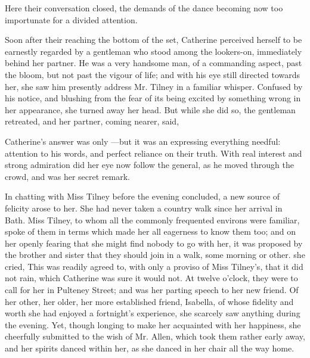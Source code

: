  Here their conversation closed, the demands of the dance becoming now too importunate for a divided attention.

Soon after their reaching the bottom of the set, Catherine perceived herself to be earnestly regarded by a gentleman who stood among the lookers-on, immediately behind her partner. He was a very handsome man, of a commanding aspect, past the bloom, but not past the vigour of life; and with his eye still directed towards her, she saw him presently address Mr. Tilney in a familiar whisper. Confused by his notice, and blushing from the fear of its being excited by something wrong in her appearance, she turned away her head. But while she did so, the gentleman retreated, and her partner, coming nearer, said, 

Catherine's answer was only ---but it was an  expressing everything needful: attention to his words, and perfect reliance on their truth. With real interest and strong admiration did her eye now follow the general, as he moved through the crowd, and  was her secret remark.

In chatting with Miss Tilney before the evening concluded, a new source of felicity arose to her. She had never taken a country walk since her arrival in Bath. Miss Tilney, to whom all the commonly frequented environs were familiar, spoke of them in terms which made her all eagerness to know them too; and on her openly fearing that she might find nobody to go with her, it was proposed by the brother and sister that they should join in a walk, some morning or other.  she cried,  This was readily agreed to, with only a proviso of Miss Tilney's, that it did not rain, which Catherine was sure it would not. At twelve o'clock, they were to call for her in Pulteney Street; and  was her parting speech to her new friend. Of her other, her older, her more established friend, Isabella, of whose fidelity and worth she had enjoyed a fortnight's experience, she scarcely saw anything during the evening. Yet, though longing to make her acquainted with her happiness, she cheerfully submitted to the wish of Mr. Allen, which took them rather early away, and her spirits danced within her, as she danced in her chair all the way home.

